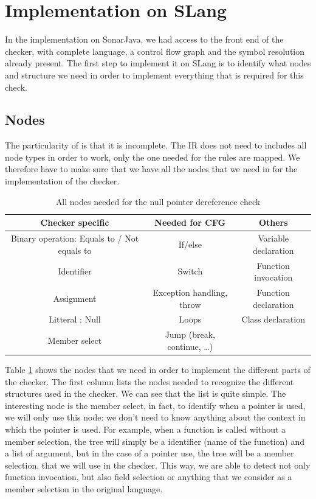 \section{Implementation on SLang}
\label{sec:implementation_slang}

In the implementation on SonarJava, we had access to the front end of the checker, with complete language, a control flow graph and the symbol resolution already present.
The first step to implement it on SLang is to identify what nodes and structure we need in order to implement everything that is required for this check.

\subsection{Nodes}
\label{subsec:nodes}

The particularity of \slang is that it is incomplete. 
The IR does not need to includes all node types in order to work, only the one needed for the rules are mapped. 
We therefore have to make sure that we have all the nodes that we need in \slang for the implementation of the checker.

\begin{table}[h]
	\centering
	\caption{All nodes needed for the null pointer dereference check}
	\label{table:nodes-needed}
	\begin{tabular}{|c|c|c|}
		\hline
		\bf Checker specific & \bf Needed for CFG & \bf Others  \\ \hline
	    Binary operation: Equals to / Not equals to & If/else & Variable declaration \\
		Identifier & Switch & Function invocation \\
		Assignment & Exception handling, throw  & Function declaration \\
		Litteral : Null & Loops & Class declaration \\
		Member select & Jump (break, continue, …) & \\
	\end{tabular}
\end{table}

Table \ref{table:nodes-needed} shows the nodes that we need in order to implement the different parts of the checker.
The first column lists the nodes needed to recognize the different structures used in the checker. 
We can see that the list is quite simple. 
The interesting node is the member select, in fact, to identify when a pointer is used, we will only use this node: we don’t need to know anything about the context in which the pointer is used. 
For example, when a function is called without a member selection, the tree will simply be a identifier (name of the function) and a list of argument, but in the case of a pointer use, the tree will be a member selection, that we will use in the checker. 
This way, we are able to detect not only function invocation, but also field selection or anything that we consider as a member selection in the original language.

